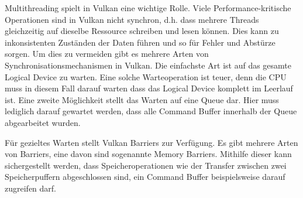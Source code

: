 \documentclass[11pt]{scrartcl}
\begin{document}
	Multithreading spielt in Vulkan eine wichtige Rolle. Viele Performance-kritische Operationen sind in Vulkan nicht synchron, d.h. dass mehrere Threads gleichzeitig auf dieselbe Ressource schreiben und lesen können\cite{Sellers2017}. Dies kann zu inkonsistenten Zuständen der Daten führen und so für Fehler und Abstürze sorgen. Um dies zu vermeiden gibt es mehrere Arten von Synchronisationsmechanismen in Vulkan\cite{VulkanSync}.
	Die einfachste Art ist auf das gesamte Logical Device zu warten. Eine solche Warteoperation ist teuer, denn die CPU muss in diesem Fall darauf warten dass das Logical Device komplett im Leerlauf ist. Eine zweite Möglichkeit stellt das Warten auf eine Queue dar. Hier muss lediglich darauf gewartet werden, dass alle Command Buffer innerhalb der Queue abgearbeitet wurden.
	
	Für gezieltes Warten stellt Vulkan Barriers zur Verfügung. Es gibt mehrere Arten von Barriers, eine davon sind sogenannte Memory Barriers. Mithilfe dieser kann sichergestellt werden, dass Speicheroperationen wie der Transfer zwischen zwei Speicherpuffern abgeschlossen sind, ein Command Buffer beispielsweise darauf zugreifen darf.\cite{VulkanMemorySyncBlog}
	
\end{document}
